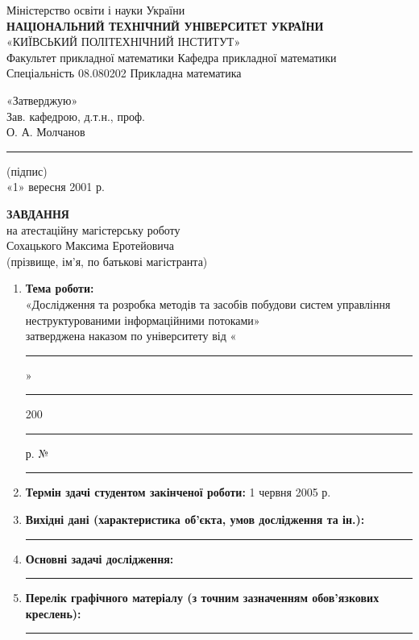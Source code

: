 \documentclass{memoir}
\begin{document}
\newpage

\begin{center}
    {\small Міністерство освіти і науки України}\\[0.3cm]
    {\large \textbf{НАЦІОНАЛЬНИЙ ТЕХНІЧНИЙ УНІВЕРСИТЕТ УКРАЇНИ}}\\[0.3cm]
    {\large «КИЇВСЬКИЙ ПОЛІТЕХНІЧНИЙ ІНСТИТУТ»}\\[0.5cm]
    {\normalsize Факультет прикладної математики \hfill Кафедра прикладної математики}\\[0.3cm]
    {\normalsize Спеціальність 08.080202 \hfill Прикладна математика}\\[1cm]
    \begin{flushright}
        \parbox{0.45\textwidth}{
            \raggedright
            «Затверджую»\\
            Зав. кафедрою, д.т.н., проф.\\
            О. А. Молчанов\\
            \rule{3cm}{0.4pt} \hfill (підпис)\\
            «1» вересня 2001 р.
        }
    \end{flushright}
    \vspace{0.5cm}
    {\large \textbf{ЗАВДАННЯ}}\\[0.3cm]
    {\normalsize на атестаційну магістерську роботу}\\[0.3cm]
    {\normalsize Сохацького Максима Еротейовича}\\[0.3cm]
    {\small (прізвище, ім’я, по батькові магістранта)}
\end{center}

\begin{enumerate}
    \item \textbf{Тема роботи:} \\
    «Дослідження та розробка методів та засобів побудови систем управління неструктурованими інформаційними потоками» \\
    затверджена наказом по університету від «\rule{1cm}{0.4pt}» \rule{2cm}{0.4pt} 200\rule{0.5cm}{0.4pt} р. №\rule{1cm}{0.4pt}
    \item \textbf{Термін здачі студентом закінченої роботи:} 1 червня 2005 р.
    \item \textbf{Вихідні дані (характеристика об’єкта, умов дослідження та ін.):} \\
    \rule{\textwidth}{0.4pt}
    \item \textbf{Основні задачі дослідження:} \\
    \rule{\textwidth}{0.4pt}
    \item \textbf{Перелік графічного матеріалу (з точним зазначенням обов’язкових креслень):} \\
    \rule{\textwidth}{0.4pt}
\end{enumerate}
\end{document}
